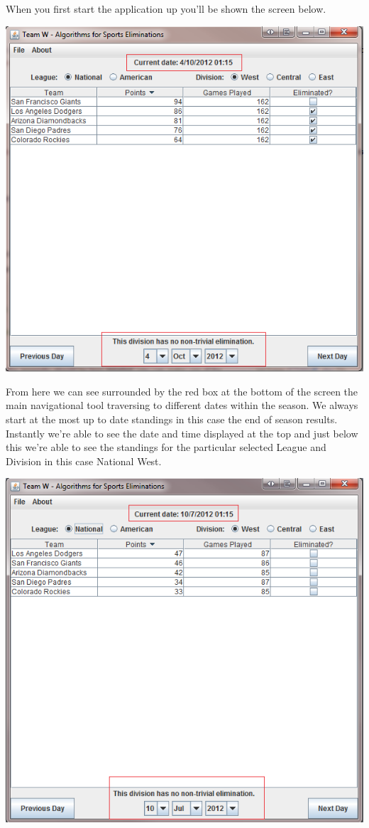 When you first start the application up you'll be shown the screen below.

\includegraphics[width=\linewidth,keepaspectratio]{images/userManualDesk1.png}

From here we can see surrounded by the red box at the bottom of the screen the
main navigational tool traversing to different dates within the season. We
always start at the most up to date standings in this case the end of season
results. Instantly we're able to see the date and time displayed at the top and
just below this we're able to see the standings for the particular selected
League and Division in this case National West.

\includegraphics[width=\linewidth,keepaspectratio]{images/userManualDesk2.png}

